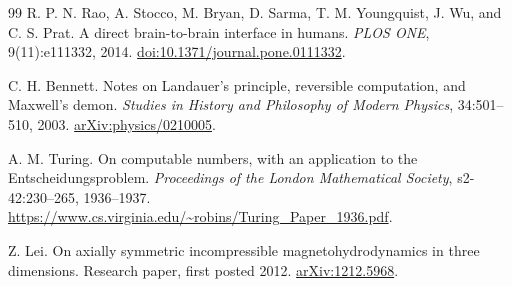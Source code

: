 \begin{thebibliography}{99}
R. P. N. Rao, A. Stocco, M. Bryan, D. Sarma, T. M. Youngquist, J. Wu, and C. S. Prat. A direct brain-to-brain interface in humans. \emph{PLOS ONE}, 9(11):e111332, 2014. \href{https://doi.org/10.1371/journal.pone.0111332}{doi:10.1371/journal.pone.0111332}.

C. H. Bennett. Notes on Landauer's principle, reversible computation, and Maxwell's demon. \emph{Studies in History and Philosophy of Modern Physics}, 34:501--510, 2003. \href{https://arxiv.org/abs/physics/0210005}{arXiv:physics/0210005}.

A. M. Turing. On computable numbers, with an application to the Entscheidungsproblem. \emph{Proceedings of the London Mathematical Society}, s2-42:230--265, 1936--1937. \url{https://www.cs.virginia.edu/~robins/Turing_Paper_1936.pdf}.

Z. Lei. On axially symmetric incompressible magnetohydrodynamics in three dimensions. Research paper, first posted 2012. \href{https://arxiv.org/abs/1212.5968}{arXiv:1212.5968}.
\end{thebibliography}
